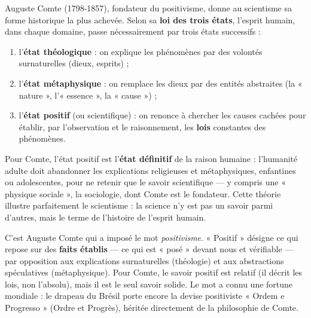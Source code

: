 \documentclass[11pt]{article}
\newcommand{\cle}[1]{{\popxbold\color{popdark}#1}}
\begin{document}
\begin{propriete}
Auguste Comte (1798-1857), fondateur du \cle{positivisme}, donne au scientisme sa forme historique la plus achevée. Selon sa \textbf{loi des trois états}, l'esprit humain, dans chaque domaine, passe nécessairement par trois états successifs :
\begin{enumerate}
\item l'\textbf{état théologique} : on explique les phénomènes par des volontés surnaturelles (dieux, esprits) ;
\item l'\textbf{état métaphysique} : on remplace les dieux par des entités abstraites (la « nature », l'« essence », la « cause ») ;
\item l'\textbf{état positif} (ou scientifique) : on renonce à chercher les causes cachées pour établir, par l'observation et le raisonnement, les \textbf{lois} constantes des phénomènes.
\end{enumerate}
Pour Comte, l'état positif est l'\textbf{état définitif} de la raison humaine : l'humanité adulte doit abandonner les explications religieuses et métaphysiques, enfantines ou adolescentes, pour ne retenir que le savoir scientifique — y compris une « physique sociale », la sociologie, dont Comte est le fondateur. Cette théorie illustre parfaitement le scientisme : la science n'y est pas un savoir parmi d'autres, mais le terme de l'histoire de l'esprit humain.
\end{propriete}

\begin{savaistu}
C'est Auguste Comte qui a imposé le mot \emph{positivisme}. « Positif » désigne ce qui repose sur des \textbf{faits établis} — ce qui est « posé » devant nous et vérifiable — par opposition aux explications surnaturelles (théologie) et aux abstractions spéculatives (métaphysique). Pour Comte, le savoir positif est relatif (il décrit les lois, non l'absolu), mais il est le seul savoir solide. Le mot a connu une fortune mondiale : le drapeau du Brésil porte encore la devise positiviste « Ordem e Progresso » (Ordre et Progrès), héritée directement de la philosophie de Comte.
\end{savaistu}
\end{document}
